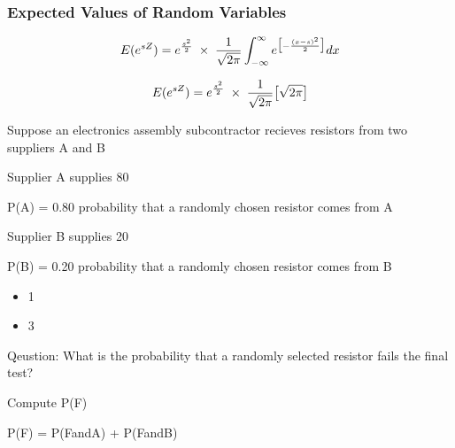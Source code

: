 \documentclass{beamer}
\begin{document}
	\begin{frame}
		\frametitle{Expected Values of Random Variables}
		\Large
		\vspace{-2.5cm}
		
		
		
		{
			\LARGE
			\[ E( e^{sZ} ) =  e^{{s^2\over 2}} \; \times\; \frac{1}{\sqrt{2\pi}} \int_{-\infty}^{\infty} e^{ \big[-\frac{(x-s)^2}{2} \big]} dx \]
			
			
			\[ E( e^{sZ} ) =  e^{{s^2\over 2}} \; \times\; \frac{1}{\sqrt{2\pi}} \big[\sqrt{2\pi} \big] \]
		}
		
	\end{frame}
	
	\begin{frame}
		Suppose an electronics assembly subcontractor recieves resistors from two suppliers A and B
		
		Supplier A supplies 80%
		
		P(A) = 0.80 probability that a randomly chosen resistor comes from A
		
		Supplier B supplies 20%
		
		P(B) = 0.20 probability that a randomly chosen resistor comes from B
		
	\end{frame}
	\begin{frame}
		\Large
		\begin{itemize}
			\item 1%
			\item 3%
		\end{itemize}
	\end{frame}
	\begin{frame}
		
		Qeustion: What is the probability that a randomly selected resistor fails the final test?
		
		Compute P(F) 
		
	\end{frame}
	
	\begin{frame}
		\Large
		P(F) = P(FandA) + P(FandB)
		
	\end{frame}
	
\end{document}
